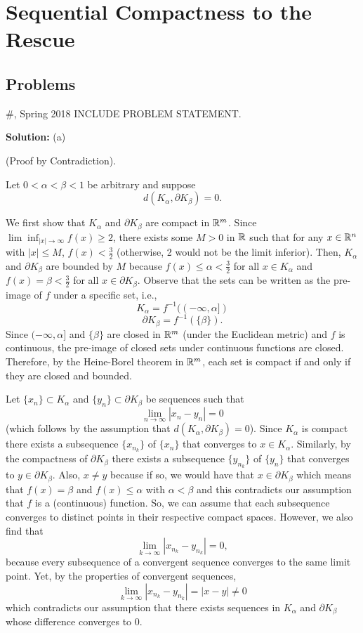 \documentclass{article}
\begin{document}
\break

\section{Sequential Compactness to the Rescue}

\subsection{Problems}

\begin{problem}{\#, Spring 2018} INCLUDE PROBLEM STATEMENT.

\end{problem}

\textbf{Solution:} (a)

(Proof by Contradiction).

Let $0 < \alpha < \beta < 1$ be arbitrary and suppose 
\[d(K_\alpha,\partial K_\beta) = 0.\]

We first show that $K_\alpha$ and $\partial K_\beta$ are compact in $\mathbb R^m$. Since $\lim\inf_{|x|\to\infty} f(x) \geq 2$, there exists some $M>0$ in $\mathbb R$ such that for any $x\in \mathbb R^n$ with $|x|\leq M$, $f(x) < \frac{3}{2}$ (otherwise, 2 would not be the limit inferior). Then, $K_\alpha$ and $\partial K_\beta$ are bounded by $M$ because $f(x) \leq \alpha < \frac{3}{2}$ for all $x\in K_\alpha$ and $f(x) = \beta < \frac{3}{2}$ for all $x\in \partial K_\beta$. Observe that the sets can be written as the pre-image of $f$ under a specific set, i.e.,
\[K_\alpha = f^{-1}((-\infty, \alpha])\]
\[\partial K_\beta = f^{-1}(\{\beta\}).\]
Since $(-\infty, \alpha]$ and $\{\beta\}$ are closed in $\mathbb R^m$ (under the Euclidean metric) and $f$ is continuous, the pre-image of closed sets under continuous functions are closed. Therefore, by the Heine-Borel theorem in $\mathbb R^m$, each set is compact if and only if they are closed and bounded.

Let $\{x_n\}\subset K_\alpha$ and $\{y_n\}\subset \partial K_\beta$ be sequences such that 
	\[ \lim_{n\to\infty} |x_n - y_n| = 0\]
(which follows by the assumption that $d(K_\alpha,\partial K_\beta) = 0$). Since $K_\alpha$ is compact there exists a subsequence $\{x_{n_k}\}$ of $\{x_n\}$ that converges to $x\in K_\alpha$. Similarly, by the compactness of $\partial K_\beta$ there exists a subsequence $\{y_{n_k}\}$ of $\{y_n\}$ that converges to $y\in \partial K_\beta$. Also, $x\neq y$ because if so, we would have that $x \in \partial K_\beta$ which means that $f(x) = \beta$ and $f(x) \leq \alpha$ with $\alpha < \beta$ and this contradicts our assumption that $f$ is a (continuous) function. So, we can assume that each subsequence converges to distinct points in their respective compact spaces. However, we also find that 
	\[\lim_{k\to\infty} |x_{n_k} - y_{n_k}| = 0,\]
because every subsequence of a convergent sequence converges to the same limit point. Yet, by the properties of convergent sequences, 
\[\lim_{k\to\infty} |x_{n_k} - y_{n_k}| = |x - y| \neq 0\]
which contradicts our assumption that there exists sequences in $K_\alpha$ and $\partial K_\beta$ whose difference converges to 0. 
\end{document}
